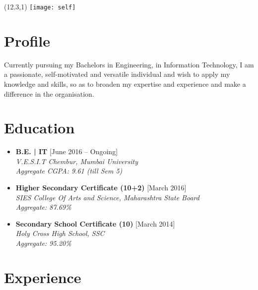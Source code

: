 \documentclass[11pt,a4paper]{moderncv}
\begin{document}
\hskip-2.5cm\makecvtitle
\begin{textblock}{0}(12.3,1)
\texttt{[image: self]}
\end{textblock}

\section{Profile}
Currently pursuing my Bachelors in Engineering, in Information Technology, I am a passionate, self-motivated and versatile individual and wish to apply my knowledge and skills, so as to broaden my expertise and experience and make a difference in the organisation.

\section{Education}

\begin{itemize}

\item \textbf{B.E. | IT} \hfill [June 2016 -- Ongoing]\\
\textit{V.E.S.I.T Chembur, Mumbai University\\
Aggregate CGPA: 9.61 (till Sem 5)\\}

\item \textbf{Higher Secondary Certificate (10+2)} \hfill [March 2016]\\
\textit{SIES College Of Arts and Science, Maharashtra State Board \\
Aggregate: 87.69\%}

\item \textbf{Secondary School Certificate (10)} \hfill [March 2014]\\
\textit{Holy Cross High School, SSC\\
Aggregate: 95.20\%}

\end{itemize}

\section{Experience}
\end{document}

